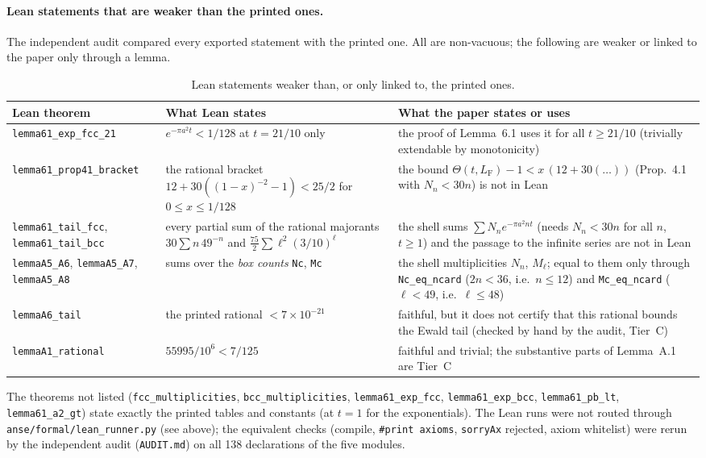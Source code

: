 \documentclass[11pt]{article}
\newcommand{\lean}[1]{\texttt{#1}}
\newcommand{\LF}{L_{\mathrm F}}
\begin{document}
\paragraph{Lean statements that are weaker than the printed ones.} The independent audit compared every exported statement with the printed one. All are non-vacuous; the following are weaker or linked to the paper only through a lemma.
\begin{table}[ht]\centering\small
\begin{tabular}{@{}l p{4.0cm} p{6.0cm}@{}}\toprule
Lean theorem & What Lean states & What the paper states or uses\\\midrule
\lean{lemma61\_exp\_fcc\_21} & $e^{-\pi a^2 t}<1/128$ at $t=21/10$ only & the proof of Lemma~6.1 uses it for all $t\ge 21/10$ (trivially extendable by monotonicity)\\
\lean{lemma61\_prop41\_bracket} & the rational bracket $12+30((1-x)^{-2}-1)<25/2$ for $0\le x\le1/128$ & the bound $\Theta(t,\LF)-1<x\,(12+30(\dots))$ (Prop.~4.1 with $N_n<30n$) is not in Lean\\
\lean{lemma61\_tail\_fcc}, \lean{lemma61\_tail\_bcc} & every partial sum of the rational majorants $30\sum n\,49^{-n}$ and $\tfrac{75}{2}\sum \ell^2(3/10)^\ell$ & the shell sums $\sum N_ne^{-\pi a^2nt}$ (needs $N_n<30n$ for all $n$, $t\ge1$) and the passage to the infinite series are not in Lean\\
\lean{lemmaA5\_A6}, \lean{lemmaA5\_A7}, \lean{lemmaA5\_A8} & sums over the \emph{box counts} \lean{Nc}, \lean{Mc} & the shell multiplicities $N_n$, $M_\ell$; equal to them only through \lean{Nc\_eq\_ncard} ($2n<36$, i.e.\ $n\le12$) and \lean{Mc\_eq\_ncard} ($\ell<49$, i.e.\ $\ell\le48$)\\
\lean{lemmaA6\_tail} & the printed rational $<7\times10^{-21}$ & faithful, but it does not certify that this rational bounds the Ewald tail (checked by hand by the audit, Tier~C)\\
\lean{lemmaA1\_rational} & $55995/10^6<7/125$ & faithful and trivial; the substantive parts of Lemma~A.1 are Tier~C\\\bottomrule
\end{tabular}
\caption{Lean statements weaker than, or only linked to, the printed ones.}\label{tab:weaker}
\end{table}
The theorems not listed (\lean{fcc\_multiplicities}, \lean{bcc\_multiplicities}, \lean{lemma61\_exp\_fcc}, \lean{lemma61\_exp\_bcc}, \lean{lemma61\_pb\_lt}, \lean{lemma61\_a2\_gt}) state exactly the printed tables and constants (at $t=1$ for the exponentials). The Lean runs were not routed through \texttt{anse/formal/lean\_runner.py} (see above); the equivalent checks (compile, \lean{\#print axioms}, \lean{sorryAx} rejected, axiom whitelist) were rerun by the independent audit (\texttt{AUDIT.md}) on all 138 declarations of the five modules.
\end{document}
